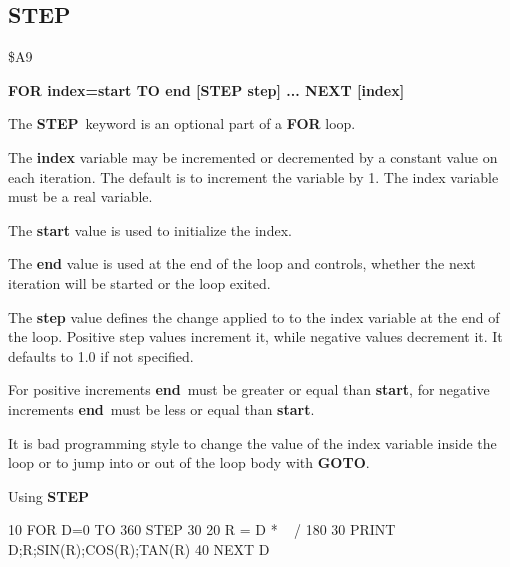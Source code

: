 
\newpage
\subsection{STEP}
\begin{description}[leftmargin=3cm,style=nextline]
\item [Token:] \$A9
\item [Format:] {\bf FOR index=start TO end [STEP step] ... NEXT [index]}
\item [Usage:] The {\bf STEP} keyword is an optional part of a
               {\bf FOR} loop.

               The {\bf index} variable may be incremented or decremented
               by a constant value on each iteration. The default
               is to increment the variable by 1.
               The index variable must be a real variable.

               The {\bf start} value is used to initialize the index.

               The {\bf end} value is used at the end of the loop
               and controls, whether the next iteration will be started
               or the loop exited.

               The {\bf step} value defines the change applied to
               to the index variable at the end of the loop.
               Positive step values increment it, while negative values
               decrement it. It defaults to 1.0 if not specified.

\item [Remarks:] For positive increments {\bf end} must be greater
               or equal than {\bf start}, for negative increments
               {\bf end} must be less or equal than {\bf start}.

               It is bad programming style to change the value
               of the index variable inside the loop or to
               jump into or out of the loop body with {\bf GOTO}.

\item [Example:] Using {\bf STEP}
\begin{screenoutput}
10 FOR D=0 TO 360 STEP 30
20 R = D * ~ / 180
30 PRINT D;R;SIN(R);COS(R);TAN(R)
40 NEXT D
\end{screenoutput}
\end{description}


\newpage
